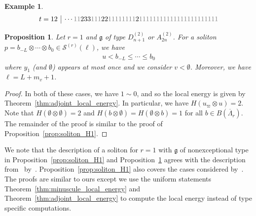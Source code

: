 \documentclass[reqno]{amsart}
\newcommand{\g}{\mathfrak{g}}
\newcommand{\clfw}{\overline{\Lambda}} %
\newcommand{\Sol}{\mathcal{S}} %
\theoremstyle{plain}
\newtheorem{prop}[thm]{Proposition}
\theoremstyle{definition}
\newtheorem{ex}[thm]{Example}
\numberwithin{equation}{section}
\begin{document}
\begin{ex}
\[{\begin{array}{c|c}
t = 12 & \cdots  {\color{gray} 1} {\color{gray} 1} 2 3 3 {\color{gray} 1} {\color{gray} 1} {\color{gray} 1} 2 2 {\color{gray} 1} {\color{gray} 1} {\color{gray} 1} {\color{gray} 1} {\color{gray} 1} {\color{gray} 1} {\color{gray} 1} {\color{gray} 1} 2 {\color{gray} 1} {\color{gray} 1} {\color{gray} 1} {\color{gray} 1} {\color{gray} 1} {\color{gray} 1} {\color{gray} 1} {\color{gray} 1} {\color{gray} 1} {\color{gray} 1} {\color{gray} 1} {\color{gray} 1} {\color{gray} 1} {\color{gray} 1} {\color{gray} 1} {\color{gray} 1} {\color{gray} 1} {\color{gray} 1} {\color{gray} 1} {\color{gray} 1} {\color{gray} 1} {\color{gray} 1} {\color{gray} 1} \\
\end{array}}
\]
\end{ex}

\begin{prop}
\label{prop:soliton_H2}
Let $r = 1$ and $\g$ of type $D_{n+1}^{(2)}$ or $A_{2n}^{(2)}$.
For a soliton $p = b_{-L} \otimes \cdots \otimes b_0 \in \Sol^{(r)}(\ell)$, we have
\begin{align*}
u < b_{-L} \leq \cdots \leq b_0
\end{align*}
where $y_1$ (and $\emptyset$) appears at most once and we consider $v < \emptyset$.
Moreover, we have $\ell = L + m_v + 1$.
\end{prop}

\begin{proof}
In both of these cases, we have $1 \sim 0$, and so the local energy is given by Theorem~\ref{thm:adjoint_local_energy}.
In particular, we have $H(u_{\varpi} \otimes u) = 2$.
Note that $H(\emptyset \otimes \emptyset) = 2$ and $H(b \otimes \emptyset) = H(\emptyset \otimes b) = 1$ for all $b \in B(\clfw_r)$.
The remainder of the proof is similar to the proof of Proposition~\ref{prop:soliton_H1}.
\end{proof}

We note that the description of a soliton for $r = 1$ with $\g$ of nonexceptional type in Proposition~\ref{prop:soliton_H1} and Proposition~\ref{prop:soliton_H2} agrees with the description from~\cite[Sec.~2.3]{HKOTY02} by~\cite[Lemma~2.5]{HKOTY02}.
Proposition~\ref{prop:soliton_H1} also covers the cases considered by~\cite{binMohamad12,Yamada04,Yamada07}.
The proofs are similar to ours except we use the uniform statements Theorem~\ref{thm:minuscule_local_energy} and Theorem~\ref{thm:adjoint_local_energy} to compute the local energy instead of type specific computations.
\end{document}
